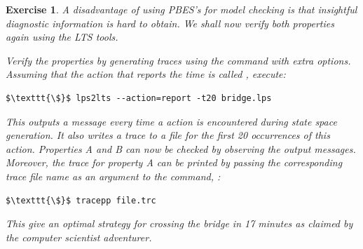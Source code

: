 \documentclass[11pt]{article}
\theoremstyle{myplain}
\newtheorem{exercise}{Exercise}
\theoremstyle{definition} %
\begin{document}
\begin{exercise}
A disadvantage of using PBES's for model checking is that insightful diagnostic information is hard to obtain. We shall now verify both properties again using the LTS tools.

Verify the properties by generating traces using the  command with extra options. Assuming that the action that reports the time is called , execute:

\begin{lstlisting}[style=bash]
$\texttt{\$}$ lps2lts --action=report -t20 bridge.lps
\end{lstlisting}

This outputs a message every time a  action is encountered during state space generation. It also writes a trace to a file for the first 20 occurrences of this action. Properties A and B can now be checked by observing the output messages. Moreover, the trace for property A can be printed by passing the corresponding trace file name as an argument to the  command, \eg:
%
\begin{lstlisting}[style=bash]
$\texttt{\$}$ tracepp file.trc
\end{lstlisting}
%
This give an optimal strategy for crossing the bridge in 17 minutes as claimed by the computer scientist adventurer.

\end{exercise}
\end{document}
